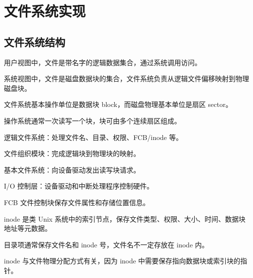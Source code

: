 \chapter{文件系统实现}

\section{文件系统结构}
\begin{points}
  \item 用户视图中，文件是带名字的逻辑数据集合，通过系统调用访问。
  \item 系统视图中，文件是磁盘数据块的集合，文件系统负责从逻辑文件偏移映射到物理磁盘块。
  \item 文件系统基本操作单位是数据块 block，而磁盘物理基本单位是扇区 sector。
  \item 操作系统通常一次读写一个块，块可由多个连续扇区组成。
\end{points}


\begin{points}
  \item 逻辑文件系统：处理文件名、目录、权限、FCB/inode 等。
  \item 文件组织模块：完成逻辑块到物理块的映射。
  \item 基本文件系统：向设备驱动发出读写块请求。
  \item I/O 控制层：设备驱动和中断处理程序控制硬件。
\end{points}


\begin{points}
  \item FCB 文件控制块保存文件属性和存储位置信息。
  \item inode 是类 Unix 系统中的索引节点，保存文件类型、权限、大小、时间、数据块地址等元数据。
  \item 目录项通常保存文件名和 inode 号，文件名不一定存放在 inode 内。
  \item inode 与文件物理分配方式有关，因为 inode 中需要保存指向数据块或索引块的指针。
\end{points}

